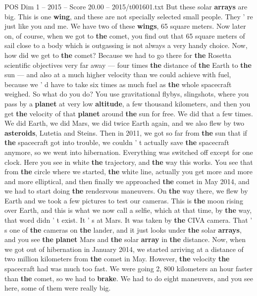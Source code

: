 \begin{textsample}{POS Dim 1 – 2015 – Score 20.00 – 2015/t001601.txt}
But these solar \textbf{arrays} are big.
This is one \textbf{wing}, and these are not specially selected small people.
They ' re just like you and me.
We have two of these \textbf{wings}, 65 square meters.
Now later on, of course, when we got to \textbf{the} comet, you find out that 65 square meters of sail close to a body which is outgassing is not always a very handy choice.
Now, how did we get to \textbf{the} comet?
Because we had to go there for \textbf{the} Rosetta scientific objectives very far away — four times \textbf{the} distance of \textbf{the} Earth to \textbf{the} sun — and also at a much higher velocity than we could achieve with fuel, because we ' d have to take six times as much fuel as \textbf{the} whole spacecraft weighed.
So what do you do?
You use gravitational flybys, slingshots, where you pass by a \textbf{planet} at very low \textbf{altitude}, a few thousand kilometers, and then you get \textbf{the} velocity of that \textbf{planet} around \textbf{the} sun for free.
We did that a few times.
We did Earth, we did Mars, we did twice Earth again, and we also flew by two \textbf{asteroids}, Lutetia and Steins.
Then in 2011, we got so far from \textbf{the} sun that if \textbf{the} spacecraft got into trouble, we couldn ' t actually save \textbf{the} spacecraft anymore, so we went into hibernation.
Everything was switched off except for one clock.
Here you see in white \textbf{the} trajectory, and \textbf{the} way this works.
You see that from \textbf{the} circle where we started, \textbf{the} white line, actually you get more and more and more elliptical, and then finally we approached \textbf{the} comet in May 2014, and we had to start doing \textbf{the} rendezvous maneuvers.
On \textbf{the} way there, we flew by Earth and we took a few pictures to test our cameras.
This is \textbf{the} moon rising over Earth, and this is what we now call a selfie, which at that time, by \textbf{the} way, that word didn ' t exist.
It ' s at Mars.
It was taken by \textbf{the} CIVA camera.
That ' s one of \textbf{the} cameras on \textbf{the} lander, and it just looks under \textbf{the} solar \textbf{arrays}, and you see \textbf{the} \textbf{planet} Mars and \textbf{the} solar \textbf{array} in \textbf{the} distance.
Now, when we got out of hibernation in January 2014, we started arriving at a distance of two million kilometers from \textbf{the} comet in May.
However, \textbf{the} velocity \textbf{the} spacecraft had was much too fast.
We were going 2, 800 kilometers an hour faster than \textbf{the} comet, so we had to \textbf{brake}.
We had to do eight maneuvers, and you see here, some of them were really big.

\end{textsample}

